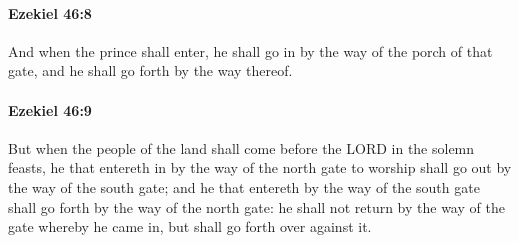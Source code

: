 		\paragraph{Ezekiel 46:8} %
			\label{EZEKIEL-46-8}

			And when the prince shall enter, he shall go in by the way of the porch of that gate, and he shall go forth by the way thereof.


		\paragraph{Ezekiel 46:9} %
			\label{EZEKIEL-46-9}

			But when the people of the land shall come before the LORD in the solemn feasts, he that entereth in by the way of the north gate to worship shall go out by the way of the south gate; and he that entereth by the way of the south gate shall go forth by the way of the north gate: he shall not return by the way of the gate whereby he came in, but shall go forth over against it.

